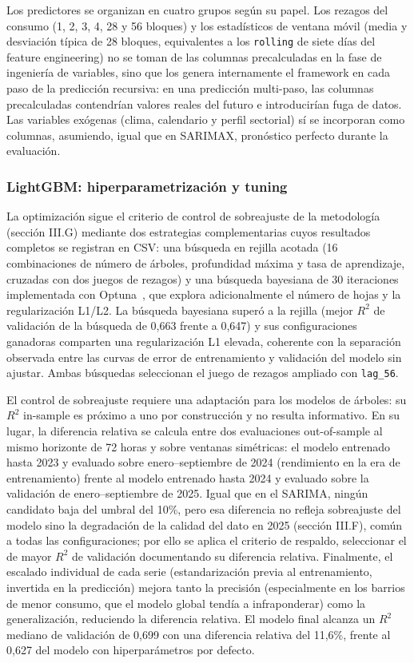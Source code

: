 \documentclass[12pt, a4paper]{article}
\begin{document}
Los predictores se organizan en cuatro grupos según su papel. Los rezagos del consumo (1, 2, 3, 4, 28 y 56 bloques) y los estadísticos de ventana móvil (media y desviación típica de 28 bloques, equivalentes a los \texttt{rolling} de siete días del feature engineering) no se toman de las columnas precalculadas en la fase de ingeniería de variables, sino que los genera internamente el framework en cada paso de la predicción recursiva: en una predicción multi-paso, las columnas precalculadas contendrían valores reales del futuro e introducirían fuga de datos. Las variables exógenas (clima, calendario y perfil sectorial) sí se incorporan como columnas, asumiendo, igual que en SARIMAX, pronóstico perfecto durante la evaluación.

\subsubsection{LightGBM: hiperparametrización y tuning}


La optimización sigue el criterio de control de sobreajuste de la metodología (sección III.G) mediante dos estrategias complementarias cuyos resultados completos se registran en CSV: una búsqueda en rejilla acotada (16 combinaciones de número de árboles, profundidad máxima y tasa de aprendizaje, cruzadas con dos juegos de rezagos) y una búsqueda bayesiana de 30 iteraciones implementada con Optuna~\cite{optuna2019}, que explora adicionalmente el número de hojas y la regularización L1/L2. La búsqueda bayesiana superó a la rejilla (mejor $R^2$ de validación de la búsqueda de 0,663 frente a 0,647) y sus configuraciones ganadoras comparten una regularización L1 elevada, coherente con la separación observada entre las curvas de error de entrenamiento y validación del modelo sin ajustar. Ambas búsquedas seleccionan el juego de rezagos ampliado con \texttt{lag\_56}.

El control de sobreajuste requiere una adaptación para los modelos de árboles: su $R^2$ in-sample es próximo a uno por construcción y no resulta informativo. En su lugar, la diferencia relativa se calcula entre dos evaluaciones out-of-sample al mismo horizonte de 72 horas y sobre ventanas simétricas: el modelo entrenado hasta 2023 y evaluado sobre enero--septiembre de 2024 (rendimiento en la era de entrenamiento) frente al modelo entrenado hasta 2024 y evaluado sobre la validación de enero--septiembre de 2025. Igual que en el SARIMA, ningún candidato baja del umbral del 10\%, pero esa diferencia no refleja sobreajuste del modelo sino la degradación de la calidad del dato en 2025 (sección III.F), común a todas las configuraciones; por ello se aplica el criterio de respaldo, seleccionar el de mayor $R^2$ de validación documentando su diferencia relativa. Finalmente, el escalado individual de cada serie (estandarización previa al entrenamiento, invertida en la predicción) mejora tanto la precisión (especialmente en los barrios de menor consumo, que el modelo global tendía a infraponderar) como la generalización, reduciendo la diferencia relativa. El modelo final alcanza un $R^2$ mediano de validación de 0,699 con una diferencia relativa del 11,6\%, frente al 0,627 del modelo con hiperparámetros por defecto.
\end{document}
